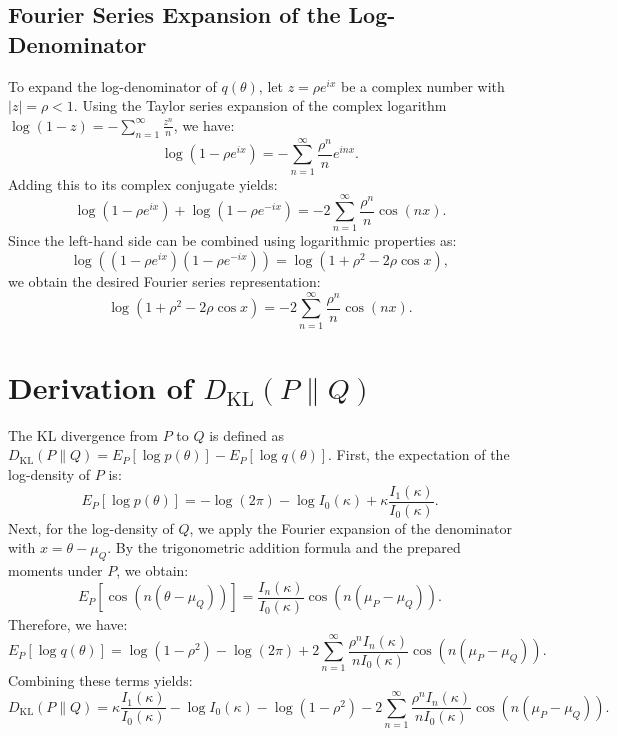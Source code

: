 \documentclass[11pt,a4paper]{article}
\begin{document}
\subsection{Fourier Series Expansion of the Log-Denominator}
To expand the log-denominator of $q(\theta)$, let $z = \rho e^{ix}$ be a complex number with $|z| = \rho < 1$. Using the Taylor series expansion of the complex logarithm $\log(1-z) = -\sum_{n=1}^\infty \frac{z^n}{n}$, we have:
\begin{equation}
\log(1 - \rho e^{ix}) = -\sum_{n=1}^\infty \frac{\rho^n}{n} e^{inx}.
\end{equation}
Adding this to its complex conjugate yields:
\begin{equation}
\log(1 - \rho e^{ix}) + \log(1 - \rho e^{-ix}) = -2 \sum_{n=1}^\infty \frac{\rho^n}{n} \cos(nx).
\end{equation}
Since the left-hand side can be combined using logarithmic properties as:
\begin{equation}
\log((1 - \rho e^{ix})(1 - \rho e^{-ix})) = \log(1 + \rho^2 - 2\rho\cos x),
\end{equation}
we obtain the desired Fourier series representation:
\begin{equation}
\log(1 + \rho^2 - 2\rho\cos x) = -2 \sum_{n=1}^\infty \frac{\rho^n}{n} \cos(nx).
\end{equation}

\section{Derivation of $D_{\text{KL}}(P \parallel Q)$}
The KL divergence from $P$ to $Q$ is defined as $D_{\text{KL}}(P \parallel Q) = E_P[\log p(\theta)] - E_P[\log q(\theta)]$. First, the expectation of the log-density of $P$ is:
\begin{equation}
E_P[\log p(\theta)] = -\log(2\pi) - \log I_0(\kappa) + \kappa \frac{I_1(\kappa)}{I_0(\kappa)}.
\end{equation}
Next, for the log-density of $Q$, we apply the Fourier expansion of the denominator with $x = \theta - \mu_Q$. By the trigonometric addition formula and the prepared moments under $P$, we obtain:
\begin{equation}
E_P[\cos(n(\theta - \mu_Q))] = \frac{I_n(\kappa)}{I_0(\kappa)} \cos(n(\mu_P - \mu_Q)).
\end{equation}
Therefore, we have:
\begin{equation}
E_P[\log q(\theta)] = \log(1 - \rho^2) - \log(2\pi) + 2 \sum_{n=1}^\infty \frac{\rho^n I_n(\kappa)}{n I_0(\kappa)} \cos(n(\mu_P - \mu_Q)).
\end{equation}
Combining these terms yields:
\begin{equation}
D_{\text{KL}}(P \parallel Q) = \kappa \frac{I_1(\kappa)}{I_0(\kappa)} - \log I_0(\kappa) - \log(1 - \rho^2) - 2 \sum_{n=1}^\infty \frac{\rho^n I_n(\kappa)}{n I_0(\kappa)} \cos(n(\mu_P - \mu_Q)).
\end{equation}
\end{document}
